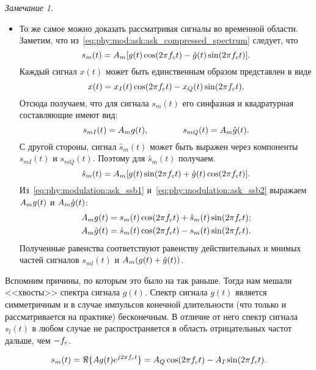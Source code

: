 \documentclass{book}
\numberwithin{theorem}{chapter}
\numberwithin{statement}{chapter}
\numberwithin{lemma}{chapter}
\theoremstyle{definition}
\numberwithin{task}{chapter}
\theoremstyle{remark}
\numberwithin{example}{chapter}
\theoremstyle{definition}
\numberwithin{definition}{chapter}
\theoremstyle{remark}
\newtheorem{note}{Замечание}
\theoremstyle{remark}
\numberwithin{lyrics}{section}
\begin{document}
\begin{note}
\begin{itemize}
		\item То же самое можно доказать рассматривая сигналы во временной области. Заметим, что из~\eqref{eq:phy:mod:ask:ask_compressed_spectrum} следует, что
		\begin{equation}
		\label{eq:phy:modulation:ask_ssb1}
		s_m(t) = A_m [g(t) \cos(2\pi f_c t) - \hat{g}(t) \sin(2\pi f_c t)].
		\end{equation}
		Каждый сигнал $x(t)$ может быть единственным образом представлен в виде
		\begin{equation}
		\notag
		x(t) = x_I(t) \cos(2\pi f_c t)- x_Q(t) \sin (2\pi f_c t).
		\end{equation}
		Отсюда получаем, что для сигнала $s_m(t)$ его синфазная и квадратурная составляющие имеют вид:
		\begin{equation*}
		s_{mI}(t) = A_m g(t), \qquad\qquad s_{mQ}(t) = A_m \hat{g}(t).
		\end{equation*}
		С другой стороны, сигнал $\hat{s}_m(t)$ может быть выражен через компоненты $s_{mI}(t)$ и $s_{mQ}(t)$. Поэтому для $\hat{s}_m(t)$ получаем.
		\begin{equation}
		\label{eq:phy:modulation:ask_ssb2}
		\hat{s}_m(t) = A_m [g(t) \sin(2\pi f_c t) + \hat{g}(t) \cos(2 \pi f_c t)].
		\end{equation}
		Из~\eqref{eq:phy:modulation:ask_ssb1} и~\eqref{eq:phy:modulation:ask_ssb2} выражаем $A_m g(t)$ и $A_m \hat{g}(t)$:
		\begin{align*}
		A_m        g(t) &= s_m(t) \cos(2\pi f_c t) + \hat{s}_m(t) \sin(2\pi f_c t); \\
		A_m  \hat{g}(t) &= \hat{s}_m(t) \cos(2\pi f_c t) - s_m(t) \sin(2\pi f_c t).
		\end{align*}
		Полученные равенства соответствуют равенству действительных и мнимых частей сигналов $s_{ml}(t)$ и $A_m(g(t) + \hat{g}(t))$.
	\end{itemize}
	
	Вспомним причины, по которым это было на так раньше. Тогда нам мешали <<хвосты>> спектра сигнала $g(t)$. Спектр сигнала $g(t)$ является симметричным и в случае импульсов конечной длительности (что только и рассматривается на практике) бесконечным. В отличие от него спектр сигнала $s_l(t)$ в любом случае не распространяется в область отрицательных частот дальше, чем $-f_c$. 
\end{note}


$$s_m(t) = \Re\{A g(t) e^{j2\pi f_c t}\} = A_Q \cos(2\pi f_c t) - A_I \sin(2 \pi f_c t).$$
\end{document}
